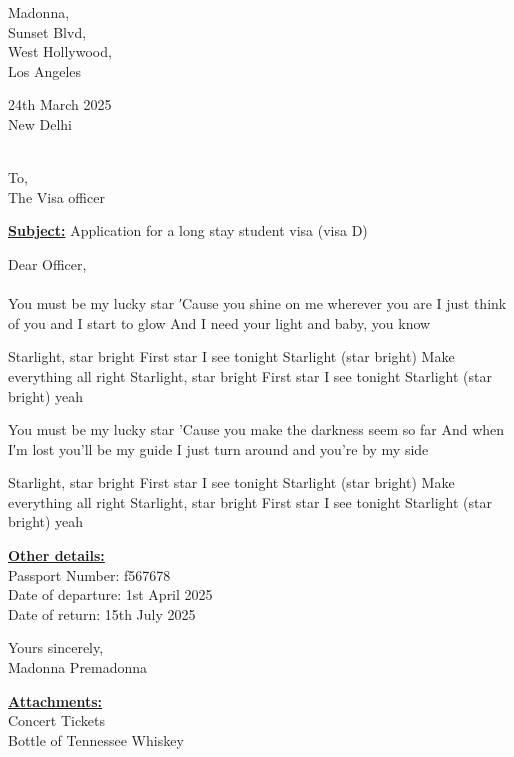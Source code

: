 \documentclass[12pt]{letter}
\begin{document}
	
	\begin{minipage}{0.5\textwidth}
		\raggedright
		Madonna, \\
		Sunset Blvd, \\
		West Hollywood, \\
		Los Angeles
	\end{minipage}
	\begin{minipage}{0.5\textwidth}
		\raggedleft
		24th March 2025 \\
		New Delhi
	\end{minipage}
	\smallskip \\
	
	To, \\
	The Visa officer 
	
	\begin{center}
		\underline{\textbf{Subject:}} Application for a long stay student visa (visa D)
	\end{center}
	
	Dear Officer, \\
	\smallskip \\
	You must be my lucky star
	′Cause you shine on me wherever you are
	I just think of you and I start to glow
	And I need your light and baby, you know
	
	Starlight, star bright
	First star I see tonight
	Starlight (star bright)
	Make everything all right
	Starlight, star bright
	First star I see tonight
	Starlight (star bright) yeah
	
	You must be my lucky star
	'Cause you make the darkness seem so far
	And when I′m lost you'll be my guide
	I just turn around and you're by my side
	
	Starlight, star bright
	First star I see tonight
	Starlight (star bright)
	Make everything all right
	Starlight, star bright
	First star I see tonight
	Starlight (star bright) yeah
	\smallskip
	
	\begin{minipage}{0.5\textwidth}
		\raggedright
			\underline{\textbf{Other details:}} \\
		Passport Number: f567678 \\
		\smallskip
		Date of departure: 1st April 2025 \\
		Date of return: 15th July 2025 
	\end{minipage}
	
	\medskip 
	Yours sincerely, \\
	Madonna Premadonna\\
	\medskip
	
	\begin{minipage}{0.5\textwidth}
		\raggedright
		\underline{\textbf{Attachments:}} \\
		Concert Tickets \\
		Bottle of Tennessee Whiskey
	\end{minipage}

	
	
\end{document}
